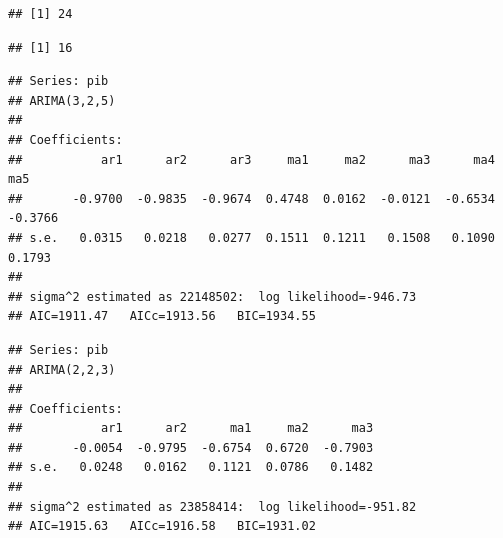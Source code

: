 \documentclass[11pt, a4paper]{report}
\newenvironment{Shaded}{\begin{snugshade}}{\end{snugshade}}
\newcommand{\KeywordTok}[1]{\textcolor[rgb]{0.13,0.29,0.53}{\textbf{#1}}}
\newcommand{\NormalTok}[1]{#1}
\newcommand{\OperatorTok}[1]{\textcolor[rgb]{0.81,0.36,0.00}{\textbf{#1}}}
\newcommand{\StringTok}[1]{\textcolor[rgb]{0.31,0.60,0.02}{#1}}
\theoremstyle{plain}
\theoremstyle{plain}
\theoremstyle{remark}
\begin{document}
\begin{Shaded}
\end{Shaded}

\begin{verbatim}
## [1] 24
\end{verbatim}

\begin{Shaded}
\end{Shaded}

\begin{verbatim}
## [1] 16
\end{verbatim}

\begin{Shaded}
\end{Shaded}

\begin{verbatim}
## Series: pib 
## ARIMA(3,2,5) 
## 
## Coefficients:
##           ar1      ar2      ar3     ma1     ma2      ma3      ma4      ma5
##       -0.9700  -0.9835  -0.9674  0.4748  0.0162  -0.0121  -0.6534  -0.3766
## s.e.   0.0315   0.0218   0.0277  0.1511  0.1211   0.1508   0.1090   0.1793
## 
## sigma^2 estimated as 22148502:  log likelihood=-946.73
## AIC=1911.47   AICc=1913.56   BIC=1934.55
\end{verbatim}

\begin{Shaded}
\end{Shaded}

\begin{verbatim}
## Series: pib 
## ARIMA(2,2,3) 
## 
## Coefficients:
##           ar1      ar2      ma1     ma2      ma3
##       -0.0054  -0.9795  -0.6754  0.6720  -0.7903
## s.e.   0.0248   0.0162   0.1121  0.0786   0.1482
## 
## sigma^2 estimated as 23858414:  log likelihood=-951.82
## AIC=1915.63   AICc=1916.58   BIC=1931.02
\end{verbatim}
\end{document}
